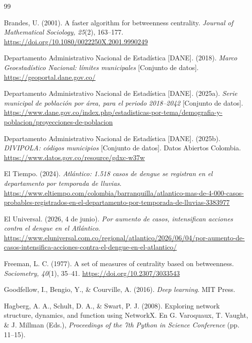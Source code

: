 \documentclass[11pt,letterpaper]{article}
\begin{document}
\newpage
\begin{thebibliography}{99}
\setlength{\itemsep}{3pt}\small
\setlength{\leftskip}{1.27cm}\setlength{\itemindent}{-1.27cm}

Brandes, U. (2001). A faster algorithm for betweenness centrality. \emph{Journal of Mathematical Sociology, 25}(2), 163--177. \url{https://doi.org/10.1080/0022250X.2001.9990249}

Departamento Administrativo Nacional de Estadística [DANE]. (2018). \emph{Marco Geoestadístico Nacional: límites municipales} [Conjunto de datos]. \url{https://geoportal.dane.gov.co/}

Departamento Administrativo Nacional de Estadística [DANE]. (2025a). \emph{Serie municipal de población por área, para el periodo 2018--2042} [Conjunto de datos]. \url{https://www.dane.gov.co/index.php/estadisticas-por-tema/demografia-y-poblacion/proyecciones-de-poblacion}

Departamento Administrativo Nacional de Estadística [DANE]. (2025b). \emph{DIVIPOLA: códigos municipios} [Conjunto de datos]. Datos Abiertos Colombia. \url{https://www.datos.gov.co/resource/gdxc-w37w}

El Tiempo. (2024). \emph{Atlántico: 1.518 casos de dengue se registran en el departamento por temporada de lluvias}. \url{https://www.eltiempo.com/colombia/barranquilla/atlantico-mas-de-4-000-casos-probables-registrados-en-el-departamento-por-temporada-de-lluvias-3383977}

El Universal. (2026, 4 de junio). \emph{Por aumento de casos, intensifican acciones contra el dengue en el Atlántico}. \url{https://www.eluniversal.com.co/regional/atlantico/2026/06/04/por-aumento-de-casos-intensifica-acciones-contra-el-dengue-en-el-atlantico/}

Freeman, L. C. (1977). A set of measures of centrality based on betweenness. \emph{Sociometry, 40}(1), 35--41. \url{https://doi.org/10.2307/3033543}

Goodfellow, I., Bengio, Y., \& Courville, A. (2016). \emph{Deep learning}. MIT Press.

Hagberg, A. A., Schult, D. A., \& Swart, P. J. (2008). Exploring network structure, dynamics, and function using NetworkX. En G. Varoquaux, T. Vaught, \& J. Millman (Eds.), \emph{Proceedings of the 7th Python in Science Conference} (pp. 11--15).


\end{thebibliography}
\end{document}
